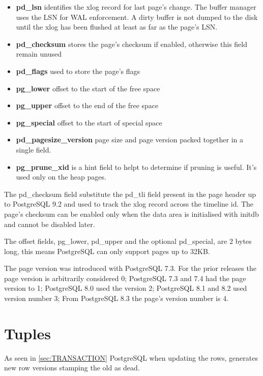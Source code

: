 \begin{itemize}
 \item \textbf{pd\_lsn} identifies the xlog record for last page's change.  The 
buffer manager uses the  LSN for WAL enforcement. A dirty buffer is not dumped 
to the disk until the xlog has been flushed at least as far as the page's LSN.
\item \textbf{pd\_checksum} stores the page's checksum if enabled, otherwise 
this field remain unused
\item \textbf{pd\_flags} used to store the page's flags 
\item \textbf{pg\_lower} offset to the start of the free space
\item \textbf{pg\_upper} offset to the end of the free space
\item \textbf{pg\_special} offset to the start of special space
\item \textbf{pd\_pagesize\_version} page size and page version packed 
together in a single field. 
\item \textbf{pg\_prune\_xid} is a hint field to helpt to determine if pruning 
is useful.  It's used only on the heap pages.

\end{itemize}

The pd\_checksum field substitute the pd\_tli field 
present in the page header up to PostgreSQL 9.2 and used to track the 
xlog record across the timeline id. 
The page's checksum can be enabled only when the data area is initialised with 
initdb and cannot be disabled later.\newline

The offset fields, pg\_lower, pd\_upper and the optional pd\_special, are 2 
bytes long, this means PostgreSQL can only support pages up to 32KB.\newline

The page version was introduced with PostgreSQL 7.3. 
For the prior releases the page version is arbitrarily considered 0; PostgreSQL 
7.3 and 7.4 had the page version to 1; PostgreSQL 8.0 used the version 2; 
PostgreSQL 8.1 and 8.2 used version number 3; From PostgreSQL 8.3 the page's 
version number is 4.

\section{Tuples}
\label{sec:TUPLES}
As seen in \ref{sec:TRANSACTION} PostgreSQL when updating the rows, generates 
new row versions stamping the old as dead. \newline


